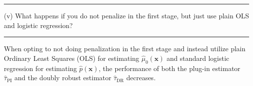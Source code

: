 \documentclass{article}
\newenvironment{colorparagraph}[1]{\par\color{#1}}{\par}
\begin{document}
\begin{colorparagraph}{questioncolor}
  \rule{\textwidth}{0.5pt}
  
  \vspace{.2cm}
(v) What happens if you do not penalize in the first stage, but just use plain OLS and logistic regression?

\rule{\textwidth}{0.5pt}
\end{colorparagraph}

When opting to not doing penalization in the first stage and instead utilize plain Ordinary Least Squares (OLS) for estimating \( \hat{\mu}_0(\mathbf{x}) \) and standard logistic regression for estimating \( \hat{p}(\mathbf{x}) \), the performance of both the plug-in estimator \( \hat{\tau}_{\text{PI}} \) and the doubly robust estimator \( \hat{\tau}_{\text{DR}} \) decreases.
\end{document}
